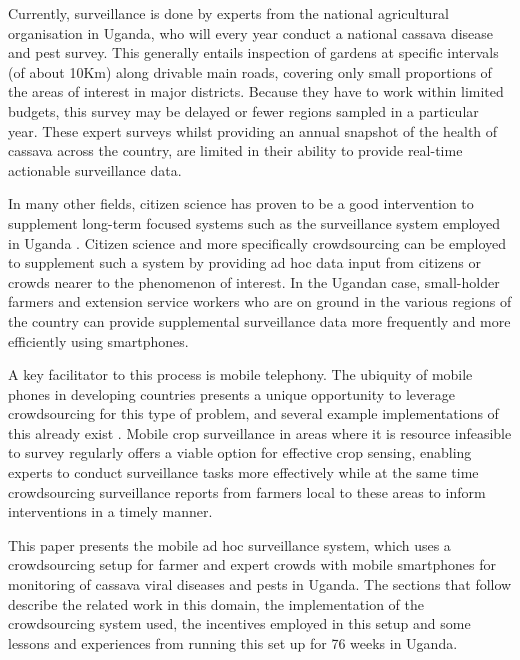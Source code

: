 \documentclass[letterpaper]{article} %
\begin{document}
Currently, surveillance is done by experts from the national agricultural organisation in Uganda, who will every year conduct a national cassava disease and pest survey. This generally entails inspection of gardens at specific intervals (of about 10Km) along drivable main roads, covering only small proportions of the areas of interest in major districts. Because they have to work within limited budgets, this survey may be delayed or fewer regions sampled in a particular year. These expert surveys whilst providing an annual snapshot of the health of cassava across the country, are limited in their ability to provide real-time actionable surveillance data.

In many other fields, citizen science has proven to be a good intervention to supplement long-term focused systems such as the surveillance system employed in Uganda \cite{silvertown2009new}. Citizen science and more specifically crowdsourcing can be employed to supplement such a system by providing ad hoc data input from citizens or crowds nearer to the phenomenon of interest. In the Ugandan case, small-holder farmers and extension service workers who are on ground in the various regions of the country can provide supplemental surveillance data more frequently and more efficiently using smartphones.

A key facilitator to this process is mobile telephony. The ubiquity of mobile phones in developing countries presents a unique opportunity to leverage crowdsourcing for this type of problem, and several example implementations of this already exist \cite{chatzimilioudis2012crowdsourcing,agapie2015crowdsourcing}. Mobile crop surveillance in areas where it is resource infeasible to survey regularly offers a viable option for effective crop sensing, enabling experts to conduct surveillance tasks more effectively while at the same time crowdsourcing surveillance reports from farmers local to these areas to inform interventions in a timely manner.

This paper presents the mobile ad hoc surveillance system, which uses a crowdsourcing setup for farmer and expert crowds with mobile smartphones for monitoring of cassava viral diseases and pests in Uganda. The sections that follow describe the related work in this domain, the implementation of the crowdsourcing system used, the incentives employed in this setup and some lessons and experiences from running this set up for 76 weeks in Uganda.
\end{document}
